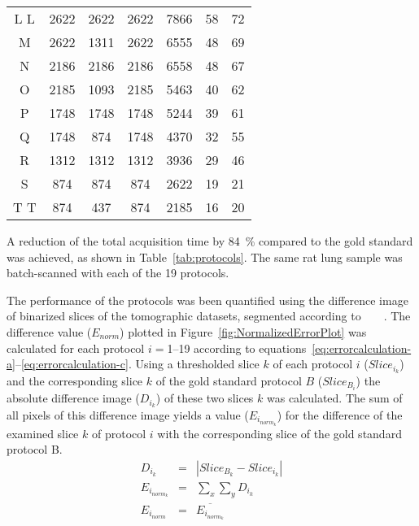 \begin{table}
\begin{tabular}{ccccccc}
		\ifiucr
			\rowcolor{lightgray} L 
		\else
		 	L
		 \fi
		  & 2622 & 2622 & 2622 & 7866  &  58 & 72\\%
		M & 2622 & 1311 & 2622 & 6555  &  48 & 69\\%
		N & 2186 & 2186 & 2186 & 6558  &  48 & 67\\%
		O & 2185 & 1093 & 2185 & 5463  &  40 & 62\\%
		P & 1748 & 1748 & 1748 & 5244  &  39 & 61\\%
		Q & 1748 & 874  & 1748 & 4370  &  32 & 55\\%
		R & 1312 & 1312 & 1312 & 3936  &  29 & 46\\%
		S & 874  & 874  & 874  & 2622  &  19 & 21\\%
		\ifiucr
			\rowcolor{lightgray} T
		\else
		 	T
		 \fi
          & 874  & 437  & 874  & 2185  &  16  & 20\\%
	\end{tabular}%
\end{table}

A reduction of the total acquisition time by \SI{84}{\percent} compared to the gold standard was achieved, as shown in Table~\ref{tab:protocols}. The same rat lung sample was batch-scanned with each of the 19 protocols.

The performance of the protocols was been quantified using the difference image of binarized slices of the tomographic datasets, segmented according to%
\ifhtml%
	~\citet{Otsu1979}%
\else%
	~%
\fi%
. The difference value ($E_{norm}$) plotted in Figure~\ref{fig:NormalizedErrorPlot} was calculated for each protocol $i=$1--19 according to equations~\ref{eq:errorcalculation-a}--\ref{eq:errorcalculation-c}. Using a thresholded slice $k$ of each protocol $i$ ($Slice_{i_{k}}$) and the corresponding slice $k$ of the gold standard protocol $B$ ($Slice_{B_{i}}$) the absolute difference image ($D_{i_{k}}$) of these two slices $k$ was calculated. The sum of all pixels of this difference image yields a value ($E_{i_{norm_{k}}}$) for the difference of the examined slice $k$ of protocol $i$ with the corresponding slice of the gold standard protocol B.
\begin{eqnarray}%
	D_{i_{k}} &=& |Slice_{B_{k}}-Slice_{i_{k}}|\label{eq:errorcalculation-a}\\%
	E_{i_{norm_{k}}} &=& \sum_{x}\sum_{y} D_{i_{k}}\label{eq:errorcalculation-b}\\%
	E_{i_{norm}} &=& \overline{E_{i_{norm_{k}}}}\label{eq:errorcalculation-c}%
\end{eqnarray}%

